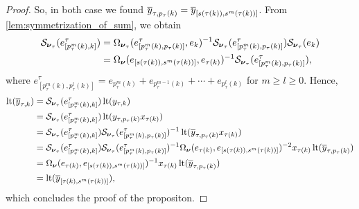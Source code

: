 \begin{proof}
	So, in both case we found $\overline{y}_{\tau, p_\tau(k)} = \overline{y}_{[s(\tau(k)), s^m(\tau(k))]}$.
	From \cref{lem:symmetrization_of_sum}, we obtain
	\begin{align*}
		\mathcal{S}_{\boldsymbol{\nu}_\tau}(e^\tau_{[p^m_\tau(k), k]})
		 & = \Omega_{\boldsymbol{\nu}_\tau}(e^\tau_{[p^m_\tau(k), p_\tau(k)]}, e_k)^{-1} \mathcal{S}_{\boldsymbol{\nu}_\tau}(e^\tau_{[p^m_\tau(k), p_\tau(k)]})\mathcal{S}_{\boldsymbol{\nu}_\tau}(e_k) \\
		 & = \Omega_{\boldsymbol{\nu}}(e_{[s(\tau(k)), s^m(\tau(k))]}, e_{\tau(k)})^{-1} \mathcal{S}_{\boldsymbol{\nu}_\tau}(e^\tau_{[p^m_\tau(k), p_\tau(k)]}),
	\end{align*}
	where $e^\tau_{[p^m_\tau(k), p^l_\tau(k)]} = e_{p^m _\tau(k)} + e_{p^{m-1}_\tau(k)} +
		\cdots + e_{p^l_\tau(k)}$ for $m \geq l \geq 0$. Hence,
	\begin{align*}
		\operatorname{lt}(\overline{y}_{\tau, k})
		 & = \mathcal{S}_{\boldsymbol{\nu}_\tau}(e^\tau_{[p^m_\tau(k), k]}) \operatorname{lt}(y_{\tau, k})                                                                                                                                              \\
		 & = \mathcal{S}_{\boldsymbol{\nu}_\tau}(e^\tau_{[p^m_\tau(k), k]}) \operatorname{lt}(y_{\tau, p_\tau(k)}x_{\tau(k)})                                                                                                                           \\
		 & = \mathcal{S}_{\boldsymbol{\nu}_\tau}(e^\tau_{[p^m_\tau(k), k]}) \mathcal{S}_{\boldsymbol{\nu}_\tau}(e^\tau_{[p^m_\tau(k), p_\tau(k)]})^{-1} \operatorname{lt}(\overline{y}_{\tau, p_\tau(k)}x_{\tau(k)})                                                                 \\
		 & = \mathcal{S}_{\boldsymbol{\nu}_\tau}(e^\tau_{[p^m_\tau(k), k]}) \mathcal{S}_{\boldsymbol{\nu}_\tau}(e^\tau_{[p^m_\tau(k), p_\tau(k)]})^{-1} \Omega_{\boldsymbol{\nu}}(e_{\tau(k)}, e_{[s(\tau(k)), s^m(\tau(k))]})^{-2} x_{\tau(k)}\operatorname{lt}(\overline{y}_{\tau, p_\tau(k)}) \\
		 & = \Omega_{\boldsymbol{\nu}}(e_{\tau(k)}, e_{[s(\tau(k)), s^m(\tau(k))]})^{-1} x_{\tau(k)}\operatorname{lt}(\overline{y}_{\tau, p_\tau(k)})                                                                                                      \\
		 & = \operatorname{lt}(\overline{y}_{[\tau(k), s^m(\tau(k))]}),
	\end{align*}
	which concludes the proof of the propositon.
\end{proof}

